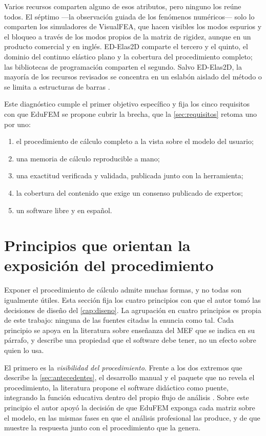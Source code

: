 Varios recursos comparten alguno de esos atributos, pero ninguno los reúne todos. El séptimo —la observación guiada de los fenómenos numéricos— solo lo comparten los simuladores de VisualFEA, que hacen visibles los modos espurios y el bloqueo a través de los modos propios de la matriz de rigidez, aunque en un producto comercial y en inglés. ED-Elas2D comparte el tercero y el quinto, el dominio del continuo elástico plano y la cobertura del procedimiento completo; las bibliotecas de programación comparten el segundo. Salvo ED-Elas2D, la mayoría de los recursos revisados se concentra en un eslabón aislado del método o se limita a estructuras de barras \autocite[p.~1023]{bishay2020teaching}.

Este diagnóstico cumple el primer objetivo específico y fija los cinco requisitos con que EduFEM se propone cubrir la brecha, que la \autoref{sec:requisitos} retoma uno por uno:

\begin{enumerate}
    \item el procedimiento de cálculo completo a la vista sobre el modelo del usuario;
    \item una memoria de cálculo reproducible a mano;
    \item una exactitud verificada y validada, publicada junto con la herramienta;
    \item la cobertura del contenido que exige un consenso publicado de expertos;
    \item un software libre y en español.
\end{enumerate}

\section{Principios que orientan la exposición del procedimiento}
\label{sec:fundamentos-pedagogicos}

Exponer el procedimiento de cálculo admite muchas formas, y no todas son igualmente útiles. Esta sección fija los cuatro principios con que el autor tomó las decisiones de diseño del \autoref{cap:diseno}. La agrupación en cuatro principios es propia de este trabajo: ninguna de las fuentes citadas la enuncia como tal. Cada principio se apoya en la literatura sobre enseñanza del MEF que se indica en su párrafo, y describe una propiedad que el software debe tener, no un efecto sobre quien lo usa.

El primero es la \emph{visibilidad del procedimiento}. Frente a los dos extremos que describe la \autoref{sec:antecedentes}, el desarrollo manual y el paquete que no revela el procedimiento, la literatura propone el software didáctico como puente, integrando la función educativa dentro del propio flujo de análisis \autocites[p.~157]{lee2015interactive}[p.~872]{lee2015eigenmodes}[p.~1008]{bishay2020teaching}. Sobre este principio el autor apoyó la decisión de que EduFEM exponga cada matriz sobre el modelo, en las mismas fases en que el análisis profesional las produce, y de que muestre la respuesta junto con el procedimiento que la genera.

